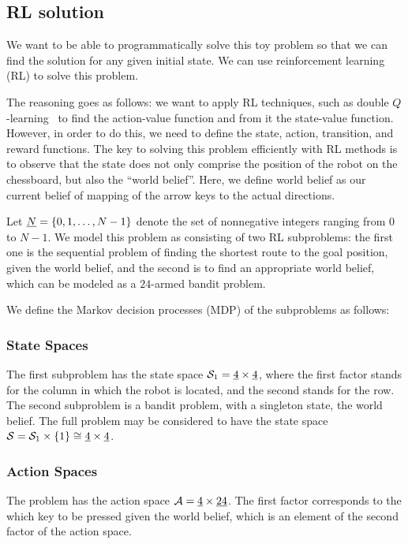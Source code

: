 \subsection{RL solution}
\label{ssec:rl_sol}
%
We want to be able to programmatically solve this toy problem so that we can 
find the solution for any given initial state. We can use reinforcement learning
(RL) to solve this problem. 

The reasoning goes as follows: we want to apply RL techniques, such as double
$Q$-learning~\cite{morales2020grokking} to find the action-value function and
from it the state-value function. However, in order to do this, we need to
define the state, action, transition, and reward functions. The key to solving 
this problem efficiently with RL methods is to observe that the state does not 
only comprise the position of the robot on the chessboard, but also the ``world 
belief''. Here, we define world belief as our current belief of mapping of the 
arrow keys to the actual directions.

Let $\uline{N} = \{0, 1, \ldots, N-1\}$ denote the set of nonnegative integers
ranging from $0$ to $N-1$. We model this problem as consisting of two RL 
subproblems: the first one is the sequential problem of finding the shortest 
route to the goal position, given the world belief, and the second is to 
find an appropriate world belief, which can be modeled as a $24$-armed bandit 
problem.

We define the Markov decision processes (MDP) of the subproblems as follows:

\subsubsection{State Spaces}
%
The first subproblem has the state space $\mc{S}_1 = \uline{4} \times
\uline{4}$, where the first factor stands for the column in which the robot 
is located, and the second stands for the row.
%
The second subproblem is a bandit problem, with a singleton state, the world 
belief.
%
The full problem may be considered to have the state space $\mc{S} = \mc{S}_1 \times \{1\} \cong \uline{4} \times \uline{4}$.

\subsubsection{Action Spaces}
%
The problem has the action space $\mc{A} = \uline{4} \times \uline{24}$. The 
first factor corresponds to the which key to be pressed given the world belief, 
which is an element of the second factor of the action space.

